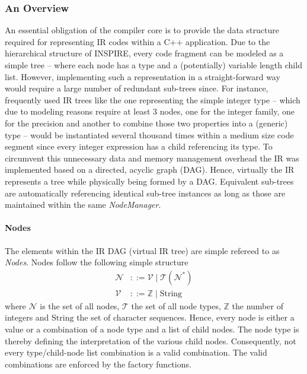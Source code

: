 \subsubsection{An Overview}
An essential obligation of the compiler core is to provide the data structure
required for representing IR codes within a C++ application. Due to the
hierarchical structure of INSPIRE, every code fragment can be modeled as a
simple tree -- where each node has a type and a (potentially) variable length
child list. However, implementing such a representation in a straight-forward
way would require a large number of redundant sub-trees since. For instance,
frequently used IR trees like the one representing the simple integer type --
which due to modeling reasons require at least 3 nodes, one for the integer
family, one for the precision and another to combine those two properties into a
(generic) type -- would be instantiated several thousand times within a medium
size code segment since every integer expression has a child referencing its
type. To circumvent this unnecessary data and memory management overhead the
IR was implemented based on a directed, acyclic graph (DAG). Hence, virtually
the IR represents a tree while physically being formed by a DAG. Equivalent
sub-trees are automatically referencing identical sub-tree instances as long as
those are maintained within the same \textit{NodeManager}.

\paragraph{Nodes}  The elements within the IR DAG (virtual IR
tree) are simple refereed to as \textit{Nodes}. Nodes follow the following
simple structure
\begin{align}
	\label{eq:Compiler.Core.NodeDef}
	\mathcal{N} &::= \mathcal{V}\;|\;\mathcal{T}(\mathcal{N}^*) \\
	\mathcal{V} &::= \mathbb{Z}\;|\;\text{String}
\end{align}
where $\mathcal{N}$ is the set of all nodes, $\mathcal{T}$ the set of all node
types, $\mathbb{Z}$ the number of integers and $\text{String}$ the set of
character sequences. Hence, every node is either a value or a combination of a
node type and a list of child nodes. The node type is thereby defining the
interpretation of the various child nodes. Consequently, not every
type/child-node list combination is a valid combination. The valid combinations
are enforced by the factory functions.

